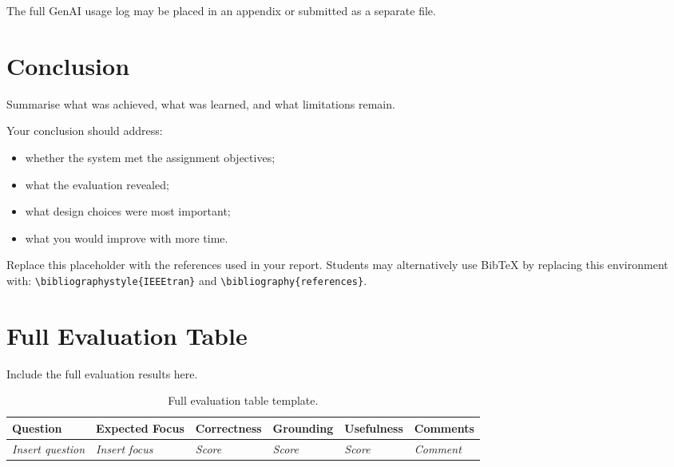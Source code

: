 \documentclass[10pt,conference]{IEEEtran}
\begin{document}
The full GenAI usage log may be placed in an appendix or submitted as a separate file.

\section{Conclusion}
\label{sec:conclusion}

Summarise what was achieved, what was learned, and what limitations remain.

Your conclusion should address:

\begin{itemize}
    \item whether the system met the assignment objectives;
    \item what the evaluation revealed;
    \item what design choices were most important;
    \item what you would improve with more time.
\end{itemize}

\begin{thebibliography}{1}

Replace this placeholder with the references used in your report.
Students may alternatively use BibTeX by replacing this environment with:
\texttt{\textbackslash bibliographystyle\{IEEEtran\}} and
\texttt{\textbackslash bibliography\{references\}}.

\end{thebibliography}

\appendices

\section{Full Evaluation Table}
\label{app:evaluation}

Include the full evaluation results here.

\begin{table}[h]
\centering
\caption{Full evaluation table template.}
\label{tab:full-eval}
\begin{tabularx}{\textwidth}{p{2.5cm} p{2.5cm} p{2cm} p{2cm} p{2cm} X}
\toprule
Question & Expected Focus & Correctness & Grounding & Usefulness & Comments \\
\midrule
\emph{Insert question} & \emph{Insert focus} & \emph{Score} & \emph{Score} & \emph{Score} & \emph{Comment} \\
\bottomrule
\end{tabularx}
\end{table}
\end{document}
